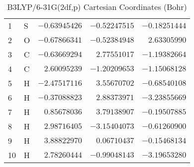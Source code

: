\documentclass[10pt,oneside]{article}
\begin{document}
\begin{table}[h]
\centering
\caption{B3LYP/6-31G(2df,p) Cartesian Coordinates (Bohr)}
\begin{tabular}{llrrr}
\toprule
1  & S  & $-0.63945426$ & $-0.52247515$ & $-0.18251444$ \\
2  & O  & $-0.67866341$ & $-0.52384948$ & $ 2.63305990$ \\
3  & C  & $-0.63669294$ & $ 2.77551017$ & $-1.19382664$ \\
4  & C  & $ 2.60095239$ & $-1.20209653$ & $-1.15068128$ \\
5  & H  & $-2.47517116$ & $ 3.55670702$ & $-0.68540108$ \\
6  & H  & $-0.37088823$ & $ 2.88373971$ & $-3.23855669$ \\
7  & H  & $ 0.85678036$ & $ 3.79138907$ & $-0.19507885$ \\
8  & H  & $ 2.98716405$ & $-3.15404073$ & $-0.61260900$ \\
9  & H  & $ 3.88822970$ & $ 0.06710437$ & $-0.15468134$ \\
10 & H  & $ 2.78260444$ & $-0.99048143$ & $-3.19653280$ \\
\bottomrule
\end{tabular}
\end{table}
\end{document}
